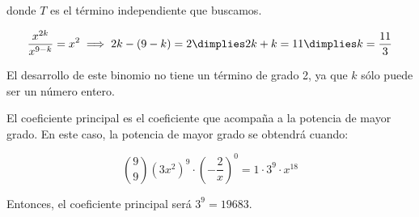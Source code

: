 \documentclass[palatino,nosec]{Docencia}
\begin{document}
\begin{problem}
donde $T$ es el término independiente que buscamos. 

\[
	\frac{x^{2k}}{x^{9-k}} = x^2 \implies 2k-(9-k) = 2 \dimplies 2k+k=11 \dimplies k=\frac{11}{3}
\]

El desarrollo de este binomio no tiene un término de grado 2, ya que $k$ sólo puede ser un número entero.

\spart El coeficiente principal es el coeficiente que acompaña a la potencia de mayor grado. En este caso, la potencia de mayor grado se obtendrá cuando:

\[
\binom{9}{9}(3x^2)^9·\left(-\frac{2}{x}\right)^0 = 1·3^9·x^{18}
\]

Entonces, el coeficiente principal será $3^9 = 19683$.

\end{problem}
\end{document}
